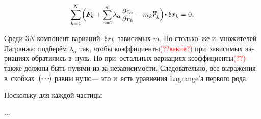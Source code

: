 \begin{otherlanguage}{russian}
\nopagebreak\vspace{-0.2em}\begin{equation}
\displaystyle \sum_{k=1}^{N} \hspace{-0.2ex} \left(^{\mathstrut} \hspace{-0.16ex} \bm{F}_k \right. \hspace{-0.32ex} + \hspace{-0.05ex}
\scalebox{0.88}[0.92]{$ \displaystyle \sum_{\alpha=1}^{m} $} \hspace{.16ex} \lambda_{\alpha} \hspace{.2ex} \scalebox{0.92}{$\displaystyle \frac{\raisemath{-0.12em}{\partial \hspace{.1ex} c_{\alpha}}}{\partial \hspace{.1ex} \locationvector_k}$}
- \left. \hspace{-0.25ex} m_k \mathdotdotabove{\locationvector}_k ^{\mathstrut}\right) \hspace{-0.32ex} \dotp \variation{\hspace{.1ex}\locationvector_k} \hspace{-0.16ex} = 0
\hspace{.1ex} .
\end{equation}

\vspace{-0.1em} \noindent Среди $3N$ компонент вариаций~${\variation{\hspace{.1ex}\locationvector_k}}$ зависимых $m$.
Но столько~же и~множителей Лагранжа: подберём $\lambda_{\alpha}$ так, чтобы коэффициенты\textcolor{red}{(??как\'{и}е?)} при~зависимых вариациях обратились в~нуль.
Но при~остальных вариациях коэффициенты\textcolor{red}{(??)} также должны быть нулями из\hbox{-}за независимости.
Следовательно, все выражения в~скобках~${(\cdots\hspace{-0.2ex})}$ равны нулю\:--- это и~есть уравнения Lagrange’а первого рода.

Поскольку для каждой частицы

...



\end{otherlanguage}



